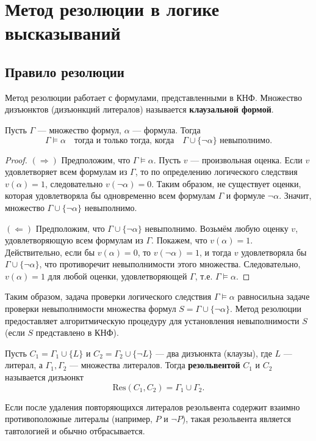 \documentclass[10pt]{article}
\begin{document}
\section{Метод резолюции в логике высказываний}

\subsection{Правило резолюции}
Метод резолюции работает с формулами, представленными в КНФ. Множество дизъюнктов (дизъюнкций литералов) называется \textbf{клаузальной формой}.

\begin{theorem}
Пусть \(\Gamma\) — множество формул, \(\alpha\) — формула. Тогда
\[
\Gamma \models \alpha \quad \text{тогда и только тогда, когда} \quad \Gamma \cup \{\neg\alpha\} \text{ невыполнимо}.
\]
\end{theorem}
\begin{proof}
\((\Rightarrow)\) Предположим, что \(\Gamma \models \alpha\). Пусть \(v\) — произвольная оценка. Если \(v\) удовлетворяет всем формулам из \(\Gamma\), то по определению логического следствия \(v(\alpha) = 1\), следовательно \(v(\neg\alpha) = 0\). Таким образом, не существует оценки, которая удовлетворяла бы одновременно всем формулам \(\Gamma\) и формуле \(\neg\alpha\). Значит, множество \(\Gamma \cup \{\neg\alpha\}\) невыполнимо.

\((\Leftarrow)\) Предположим, что \(\Gamma \cup \{\neg\alpha\}\) невыполнимо. Возьмём любую оценку \(v\), удовлетворяющую всем формулам из \(\Gamma\). Покажем, что \(v(\alpha) = 1\). Действительно, если бы \(v(\alpha) = 0\), то \(v(\neg\alpha) = 1\), и тогда \(v\) удовлетворяла бы \(\Gamma \cup \{\neg\alpha\}\), что противоречит невыполнимости этого множества. Следовательно, \(v(\alpha) = 1\) для любой оценки, удовлетворяющей \(\Gamma\), т.е. \(\Gamma \models \alpha\).
\end{proof}

Таким образом, задача проверки логического следствия \(\Gamma \models \alpha\) равносильна задаче проверки невыполнимости множества формул \(S = \Gamma \cup \{\neg\alpha\}\). Метод резолюции предоставляет алгоритмическую процедуру для установления невыполнимости \(S\) (если \(S\) представлено в КНФ).

\begin{definition}
Пусть \(C_1 = \Gamma_1 \cup \{L\}\) и \(C_2 = \Gamma_2 \cup \{\neg L\}\) — два дизъюнкта (клаузы), где \(L\) — литерал, а \(\Gamma_1, \Gamma_2\) — множества литералов. Тогда \textbf{резольвентой} \(C_1\) и \(C_2\) называется дизъюнкт
\[
\text{Res}(C_1, C_2) = \Gamma_1 \cup \Gamma_2.
\]
\end{definition}
Если после удаления повторяющихся литералов резольвента содержит взаимно противоположные литералы (например, \(P\) и \(\neg P\)), такая резольвента является тавтологией и обычно отбрасывается.
\end{document}
